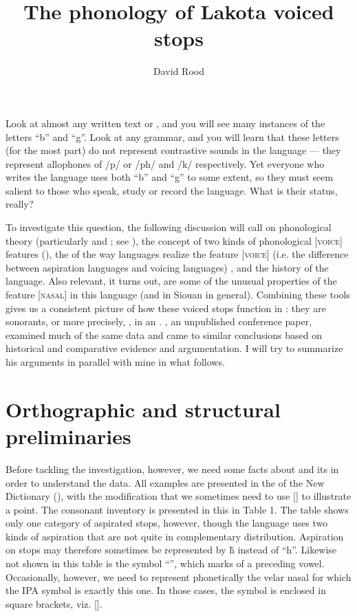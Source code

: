 \documentclass[output=paper]{LSP/langsci}
\author{David Rood}
\title{The phonology of {Lakota} voiced stops}
\begin{document}
Look at almost any written  text or , and you will see many instances of the letters ``b'' and ``g''. Look at any  grammar, and you will learn that these letters (for the most part) do not represent contrastive sounds in the language --- they represent allophones of /p/ or /ph/ and /k/ respectively. Yet everyone who writes the language uses both ``b'' and ``g'' to some extent, so they must seem salient to those who speak, study or record the language. What is their status, really?

To investigate this question, the following discussion will call on phonological theory (particularly  and ; see \citet{Clements1985}), the concept of two kinds of phonological [\textsc{voice}] features (\citealt{Rice1993}), the  of the way languages realize the feature [\textsc{voice}] (i.e. the difference between aspiration languages and voicing languages) \citep{RingenEtAl2013}, and the history of the language. Also relevant, it turns out, are some of the unusual properties of the feature [\textsc{nasal}] in this language (and in Siouan in general). Combining these tools gives us a consistent picture of how these voiced stops function in : they are sonorants, or more precisely, , in an . \citet{Rankin2001}, an unpublished conference paper, examined much of the same data and came to similar conclusions based on historical and comparative evidence and argumentation. I will try to summarize his arguments in parallel with mine in what follows.

\section{Orthographic and structural preliminaries}

Before tackling the investigation, however, we need some facts about  and its  in order to understand the data. All examples are presented in the  of the New  Dictionary (\citealt{Ullrich2012}), with the modification that we sometimes need to use [] to illustrate a point. The  consonant inventory is presented in this  in Table 1. The table shows only one category of aspirated stops, however, though the language uses two kinds of aspiration that are not quite in complementary distribution. Aspiration on stops may therefore sometimes be represented by \v{h} instead of ``h''. Likewise not shown in this table is the symbol ``'', which marks  of a preceding vowel. Occasionally, however, we need to represent phonetically the velar nasal for which the IPA symbol is exactly this one. In those cases, the symbol is enclosed in square brackets, viz. [].
\end{document}
